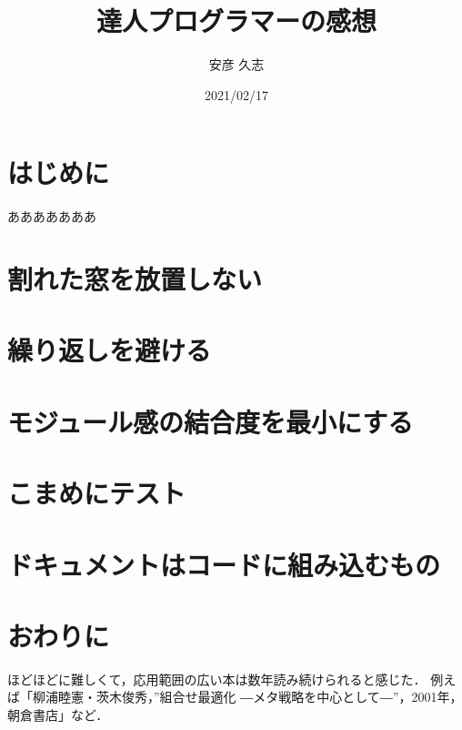 \documentclass[a4paper,twocolumn,platex,dvipdfmx]{jarticle}
\title{達人プログラマーの感想}
\date{2021/02/17}
\author{安彦 久志}
\begin{document}
\maketitle
\section{はじめに}
あああああああ
\section{割れた窓を放置しない}
\section{繰り返しを避ける}
\section{モジュール感の結合度を最小にする}
\section{こまめにテスト}
\section{ドキュメントはコードに組み込むもの}
\section{おわりに}
ほどほどに難しくて，応用範囲の広い本は数年読み続けられると感じた．
例えば「柳浦睦憲・茨木俊秀，''組合せ最適化 ―メタ戦略を中心として―''，2001年，朝倉書店」など．
\end{document}
